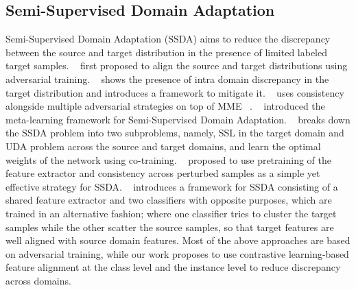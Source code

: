 \subsection{Semi-Supervised Domain Adaptation}

Semi-Supervised Domain Adaptation (SSDA) aims to reduce the discrepancy between the source and target distribution in the presence of limited labeled target samples. ~\cite{Saito2019SemiSupervisedDA} first proposed to align the source and target distributions using adversarial training. ~\cite{Kim2020AttractPA} shows the presence of intra domain discrepancy in the target distribution and introduces a framework to mitigate it. ~\cite{Jiang2020BidirectionalAT} uses consistency alongside multiple adversarial strategies on top of MME ~\cite{Saito2019SemiSupervisedDA}.  ~\cite{Li2020OnlineMF} introduced the meta-learning framework for Semi-Supervised Domain Adaptation. ~\cite{Yang2020DeepCW} breaks down the SSDA problem into two subproblems, namely, SSL in the target domain and UDA problem across the source and target domains, and learn the optimal weights of the network using co-training. ~\cite{Mishra2021SurprisinglySS}  proposed to use pretraining of the feature extractor and consistency across perturbed samples as a simple yet effective strategy for SSDA. ~\cite{Qin2020Contradictory} introduces a framework for SSDA consisting of a shared feature extractor and two classifiers with opposite purposes, which are trained in an alternative fashion; where one classifier tries to cluster the target samples while the other scatter the source samples, so that target features are well aligned with source domain features. Most of the above approaches are based on adversarial training, while our work proposes to use contrastive learning-based feature alignment at the class level and the instance level to reduce discrepancy across domains.
